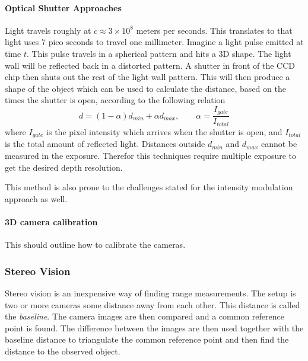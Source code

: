 \paragraph{Optical Shutter Approaches}
Light travels roughly at $c \approx 3 \times 10^8$ meters per seconds. This translates to
that light uses $7$ pico seconds to travel one millimeter. Imagine a light pulse emitted
at time $t$. This pulse travels in a spherical pattern and hits a 3D shape. The light wall
will be reflected back in a distorted pattern.\cite{optical-shutter} 
A shutter in front of the CCD chip then
shuts out the rest of the light wall pattern. This will then produce a shape of the object
which can be used to calculate the distance, based on the times the shutter is open,
according to the following relation \cite{time-of-flight-comp-graphics}
\begin{equation}
    d = (1 - \alpha) d_{min} + \alpha d_{max}, \quad \quad \alpha =
    \frac{I_{gate}}{I_{total}}
\end{equation}
where $I_{gate}$ is the pixel intensity which arrives when the shutter is open, and
$I_{total}$ is the total amount of reflected light. Distances outside $d_{min}$ and
$d_{max}$ cannot be measured in the exposure. Therefor this techniques require multiple
exposure to get the desired depth resolution. 

This method is also prone to the challenges stated for the intensity modulation approach
as well.

\paragraph{3D camera calibration}
This should outline how to calibrate the cameras. 



\subsubsection{Stereo Vision}
Stereo vision is an inexpensive way of finding range measurements. The setup is two or
more cameras some distance away from each other. This distance is called the
\emph{baseline}. The camera images are then compared and a common reference point is
found. The difference between the images are then used together with the baseline distance
to triangulate the common reference point and then find the distance to the observed
object. 

